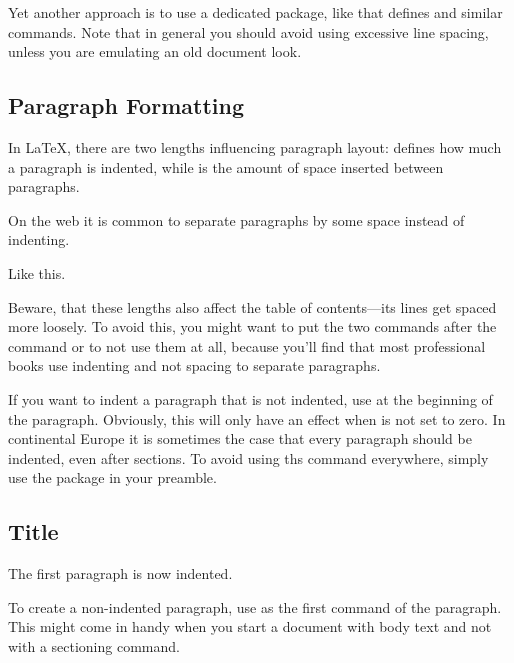 Yet another approach is to use a dedicated package, like  that
defines  and similar commands. Note that in general you
should avoid using excessive line spacing, unless you are emulating an old
document look.

\subsection{Paragraph Formatting}\label{parsp}

In \LaTeX{}, there are two lengths influencing paragraph layout:
 defines how much a paragraph is indented, while 
is the amount of space inserted between paragraphs.
\begin{example}
\setlength{\parindent}{0pt}
\setlength{\parskip}{%
  \medskipamount}

On the web it is common to
separate paragraphs by some
space instead of indenting.

Like this.
\end{example}
Beware, that these lengths also affect the table of contents---its lines get
spaced more loosely. To avoid this, you might want to put the two commands
after the  command or to not use them at all, because
you'll find that most professional books use indenting and not spacing to
separate paragraphs.

If you want to indent a paragraph that is not indented, use  at the
beginning of the paragraph. Obviously, this will only have an effect when
 is not set to zero. In continental Europe it is sometimes the
case that every paragraph should be indented, even after sections. To avoid
using ths  command everywhere, simply use the 
package in your preamble.
\begin{example}[standalone, paperheight=2.5cm, paperwidth=0.5\linewidth]
\usepackage{indentfirst}

\section{Title}

The first paragraph is now
indented.
\end{example}

To create a non-indented paragraph, use  as the first command of
the paragraph. This might come in handy when you start a document with body
text and not with a sectioning command.

